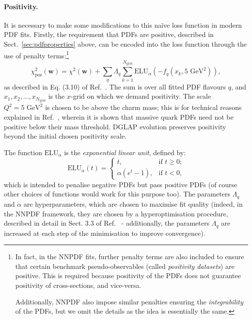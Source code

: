 \documentclass[withindex,glossary]{cam-thesis}
\renewcommand{\vec}[1]{\textbf{#1}} %
\begin{document}
\paragraph{Positivity.} It is necessary to make some modifications to this na\"{i}ve loss function in modern PDF fits. Firstly, the requirement that PDFs are positive, described in Sect.~\ref{sec:pdfproperties} above, can be encoded into the loss function through the use of penalty terms:\footnote{In fact, in the NNPDF fits, further penalty terms are also included to ensure that certain benchmark pseudo-observables (called \textit{positivity datasets}) are positive. This is required because positivity of the PDFs does not guarantee positivity of cross-sections, and vice-versa.

Additionally, NNPDF also impose similar penalties ensuring the \textit{integrability} of the PDFs, but we omit the details as the idea is essentially the same.}
\begin{equation}
\chi^2_{\text{pos}}(\vec{w}) = \chi^2(\vec{w}) + \sum_{q} \Lambda_q \sum_{k=1}^{N_{\text{grid}}} \textrm{ELU}_{\alpha}\left( - f_q(x_k, 5 \text{ GeV}^2) \right),  
\end{equation}
as described in Eq. (3.10) of Ref.~\cite{NNPDF:2021njg}. The sum is over all fitted PDF flavours $q$, and $x_1, x_2, ..., x_{N_{\text{grid}}}$ is the $x$-grid on which we demand positivity. The scale $Q^2 = 5 \text{ GeV}^2$ is chosen to be above the charm mass; this is for technical reasons explained in Ref.~\cite{Candido:2020yat}, wherein it is shown that massive quark PDFs need not be positive below their mass threshold. DGLAP evolution preserves positivity beyond the initial chosen positivity scale.

The function $\textrm{ELU}_{\alpha}$ is the \textit{exponential linear unit}, defined by:
\begin{equation}
\textrm{ELU}_{\alpha}(t) = \begin{cases} t, & \text{if $t \geq 0$;} \\ \alpha (e^t - 1), & \text{if $t < 0$,} \end{cases}
\end{equation}
which is intended to penalise negative PDFs but pass positive PDFs (of course other choices of functions would work for this purpose too). The parameters $\Lambda_q$ and $\alpha$ are hyperparameters, which are chosen to maximise fit quality (indeed, in the NNPDF framework, they are chosen by a hyperoptimisation procedure, described in detail in Sect. 3.3 of Ref.~\cite{NNPDF:2021njg} - additionally, the parameters $\Lambda_q$ are increased at each step of the minimisation to improve convergence).
\end{document}
